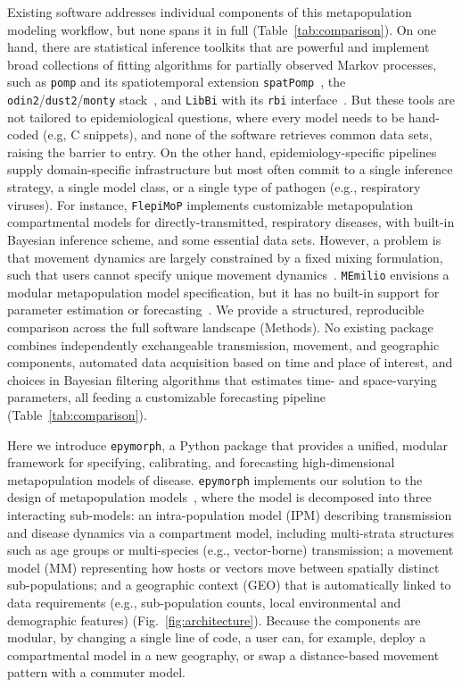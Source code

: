 Existing software addresses individual components of this metapopulation modeling workflow, but none spans it in full (Table~\ref{tab:comparison}). 
On one hand, there are statistical inference toolkits that are powerful and implement broad collections of fitting algorithms for partially observed Markov processes, such as \texttt{pomp} and its spatiotemporal extension \texttt{spatPomp}~\citep{king_statistical_2016,ionides_iterated_2024,asfaw_tutorial_2024}, the \texttt{odin2}/\texttt{dust2}/\texttt{monty} stack~\citep{fitzjohn_reproducible_2021}, and \texttt{LibBi} with its \texttt{rbi} interface~\citep{murray_bayesian_2015}. 
But these tools are not tailored to epidemiological questions, where every model needs to be hand-coded (e.g, C snippets), and none of the software retrieves common data sets, raising the barrier to entry. 
On the other hand, epidemiology-specific pipelines supply domain-specific infrastructure but most often commit to a single inference strategy, a single model class, or a single type of pathogen (e.g., respiratory viruses). 
For instance, \texttt{FlepiMoP} implements customizable metapopulation compartmental models for directly-transmitted, respiratory diseases, with built-in Bayesian inference scheme, and some essential data sets. 
However, a problem is that movement dynamics are largely constrained by a fixed mixing formulation, such that users cannot specify unique movement dynamics~\citep{lemaitre_flepimop_2024}.  
\texttt{MEmilio} envisions a modular metapopulation model specification, but it has no built-in support for parameter estimation or forecasting~\citep{bicker_memilio_2026}.
We provide a structured, reproducible comparison across the full software landscape (Methods). 
No existing package combines independently exchangeable transmission, movement, and geographic components, automated data acquisition based on time and place of interest, and choices in Bayesian filtering algorithms that estimates time- and space-varying parameters, all feeding a customizable forecasting pipeline (Table~\ref{tab:comparison}). 

Here we introduce \texttt{epymorph}, a Python package that provides a unified, modular framework for specifying, calibrating, and forecasting high-dimensional metapopulation models of disease.
\texttt{epymorph} implements our solution to the design of metapopulation models~\citep{oshinubi_systematic_2026},
where the model is decomposed into three interacting sub-models: an intra-population model (IPM) describing transmission and disease dynamics via a compartment model, including multi-strata structures such as age groups or multi-species (e.g., vector-borne) transmission; a movement model (MM) representing how hosts or vectors move between spatially distinct sub-populations; and a geographic context (GEO) that is automatically linked to data requirements (e.g., sub-population counts, local environmental and demographic features) (Fig.~\ref{fig:architecture}).
Because the components are modular, by changing a single line of code, a user can, for example, deploy a compartmental model in a new geography, or swap a distance-based movement pattern with a commuter model.



